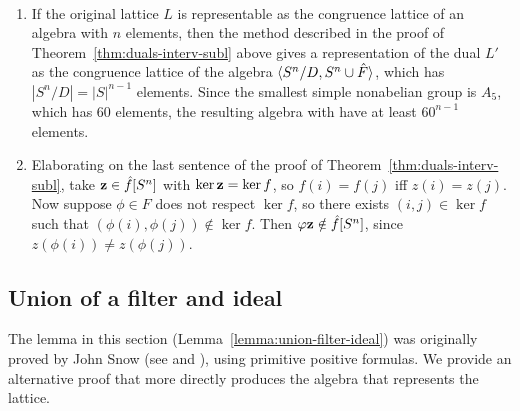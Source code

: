 \begin{remarks}\
  \begin{enumerate}
  \item
    If the original lattice $L$ is representable as the congruence lattice of
    an algebra with $n$ elements, then the method described in the proof of
    Theorem~\ref{thm:duals-interv-subl} above gives a representation of the dual
    $L'$ as the congruence lattice of the algebra
    $\langle S^n/D, S^n \cup \hat{F}\rangle$, which has $|S^n/D| = |S|^{n-1}$ elements.
    Since the smallest simple nonabelian group is $A_5$, which has 60 elements,
    the resulting algebra with have at least $60^{n-1}$ elements.
  \item 
    Elaborating on the last sentence of the proof of Theorem~\ref{thm:duals-interv-subl}, 
    take $\mathbf{z}\in \hat{f}[S^n]$ with $\ker \mathbf{z} = \ker f$, so $f(i)=f(j)$ iff
    $z(i) = z(j)$.
    Now suppose $\phi\in F$ does not respect $\ker f$, so there exists
    $(i,j) \in \ker f$ such that $(\phi(i), \phi(j)) \notin \ker f$.
    Then $\varphi \mathbf{z} \notin \hat{f}[S^n]$, since $z(\phi(i)) \neq z(\phi(j))$.
  \end{enumerate}
\end{remarks}

\subsection{Union of a filter and ideal}
\label{sec:union-filter-ideal}
The lemma in this section (Lemma~\ref{lemma:union-filter-ideal})
was originally proved by John Snow (see \cite{MR1774743} and \cite{MR2026829}),
using primitive positive formulas.  We provide an alternative 
proof that more directly produces the algebra that represents
the lattice.



